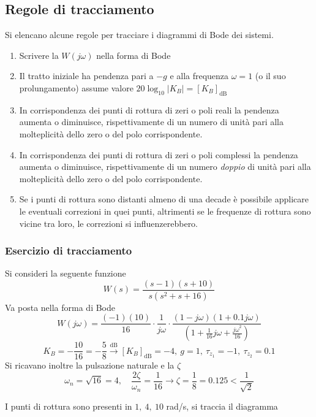 \newpage
\subsection{Regole di tracciamento}
Si elencano alcune regole per tracciare i diagrammi di Bode dei sistemi.
\begin{enumerate}
\item Scrivere la $W(j\omega)$ nella forma di Bode
\item Il tratto iniziale ha pendenza pari a $-g$ e alla frequenza $\omega=1$ (o
il suo prolungamento) assume valore $20\log_{10}|K_B| = [K_B]_{\si{\deci\bel}}$
\item In corrispondenza dei punti di rottura di zeri o poli reali la pendenza
aumenta o diminuisce, rispettivamente di un numero di unità pari alla
molteplicità dello zero o del polo corrispondente.
\item In corrispondenza dei punti di rottura di zeri o poli complessi la
pendenza
aumenta o diminuisce, rispettivamente di un numero \textit{doppio} di unità
pari alla
molteplicità dello zero o del polo corrispondente.
\item Se i punti di rottura sono distanti almeno di una decade è possibile
applicare le eventuali correzioni in quei punti, altrimenti se le frequenze di
rottura sono vicine tra loro, le correzioni si influenzerebbero.
\end{enumerate}

\newpage
\subsubsection{Esercizio di tracciamento}
Si consideri la seguente funzione
$$
W(s) = \frac{(s-1)(s+10)}{s(s^2+s+16)}
$$
Va posta nella forma di Bode
$$
W(j\omega) = \frac{(-1)(10)}{16} \cdot \frac{1}{{j\omega}}\cdot
\frac{(1-{j\omega})(1+0.1{j\omega})
}{\left( 1+\frac{1}{16}{j\omega} + \frac{{j\omega}^2}{16} \right)}
$$
$$
K_B = -\frac{10}{16} = -\frac{5}{8} \stackrel{\si{\deci\bel}}{\longrightarrow}
[K_B]_{\si{\deci\bel}} = -4,\ g=1,\ \tau_{z_1} = -1,\ \tau_{z_2} = 0.1
$$
Si ricavano inoltre la pulsazione naturale e la $\zeta$
$$
\omega_n = \sqrt{16} = 4,\quad \frac{2\zeta}{\omega_n} = \frac{1}{16}
\longrightarrow \zeta= \frac{1}{8} = 0.125 < \frac{1}{\sqrt{2}}
$$


I punti di rottura sono presenti in $1,\ 4,\ 10$ \si{\radian/\second},
si traccia il diagramma
\begin{figure}[h]
\centering
{}
\end{figure}

